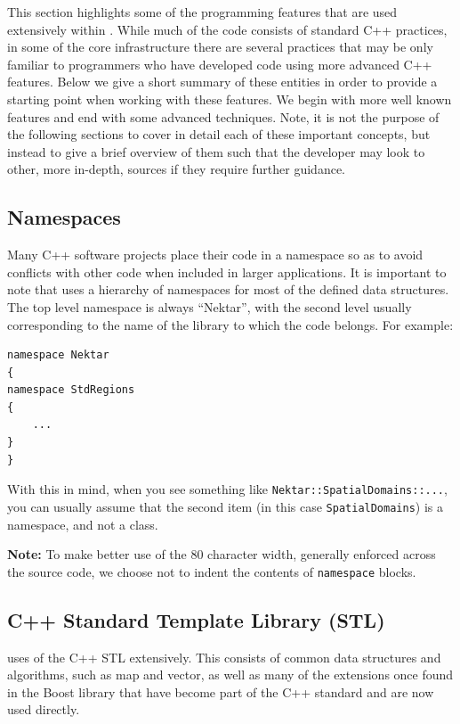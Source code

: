 This section highlights some of the programming features that are used
extensively within {\nek}. While much of the code consists of
standard C++ practices, in some of the core infrastructure there are
several practices that may be only familiar to programmers who have
developed code using more advanced C++ features.  Below we give a
short summary of these entities in order to provide a starting point
when working with these features. We begin with more well known
features and end with some advanced techniques.  Note, it is not the
purpose of the following sections to cover in detail each of these
important concepts, but instead to give a brief overview of them such that the developer may look to other, more in-depth, sources if
they require further guidance.

\subsection{Namespaces}
Many C++ software projects place their code in a namespace so as to avoid conflicts with other code when included in larger applications.  It is important to note that {\nek} uses a hierarchy of namespaces for most of the defined data structures.  The top level namespace is always ``Nektar'', with the second level usually corresponding to the name of the library to which the code belongs. For example:
\begin{lstlisting}
namespace Nektar
{
namespace StdRegions
{
    ...
}
}
\end{lstlisting}

With this in mind, when you see something like \lstinline{Nektar::SpatialDomains::...}, you can usually assume that the second item (in this case \lstinline{SpatialDomains}) is a namespace, and not a class.

\textbf{Note:} To make better use of the 80 character width, generally enforced across the {\nek} source code, we choose not to indent the contents of \lstinline|namespace| blocks.


\subsection{C++ Standard Template Library (STL) }
{\nek} uses of the C++ STL extensively.  This consists of common data structures and algorithms, such as map and vector, as well as many of the extensions once found in the Boost library that have become part of the C++ standard and are now used directly.

